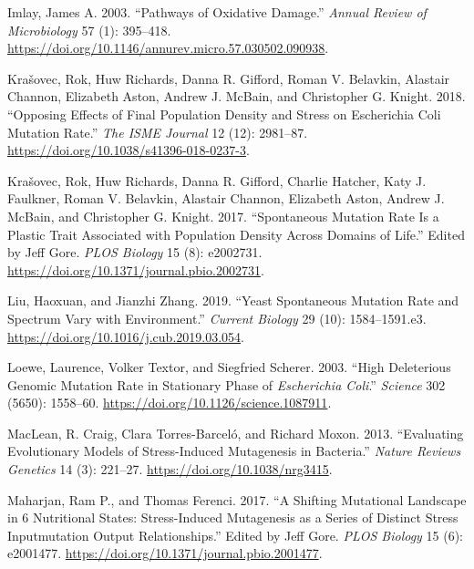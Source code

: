 \documentclass[
  12pt,
  letterpaper,
  DIV=11,
  numbers=noendperiod]{scrreprt}
\newlength{\cslhangindent}
\newlength{\cslentryspacingunit} %
\newenvironment{CSLReferences}[2] %
 {%
  \setlength{\parindent}{0pt}
  \ifodd #1
  \let\oldpar\par
  \def\par{\hangindent=\cslhangindent\oldpar}
  \fi
  \setlength{\parskip}{#2\cslentryspacingunit}
 }%
 {}
\begin{document}
\begin{CSLReferences}{1}{0}
\leavevmode{}%
Imlay, James A. 2003. {``Pathways of Oxidative Damage.''} \emph{Annual
Review of Microbiology} 57 (1): 395--418.
\url{https://doi.org/10.1146/annurev.micro.57.030502.090938}.

\leavevmode{}%
Krašovec, Rok, Huw Richards, Danna R. Gifford, Roman V. Belavkin,
Alastair Channon, Elizabeth Aston, Andrew J. McBain, and Christopher G.
Knight. 2018. {``Opposing Effects of Final Population Density and Stress
on Escherichia Coli Mutation Rate.''} \emph{The ISME Journal} 12 (12):
2981--87. \url{https://doi.org/10.1038/s41396-018-0237-3}.

\leavevmode{}%
Krašovec, Rok, Huw Richards, Danna R. Gifford, Charlie Hatcher, Katy J.
Faulkner, Roman V. Belavkin, Alastair Channon, Elizabeth Aston, Andrew
J. McBain, and Christopher G. Knight. 2017. {``Spontaneous Mutation Rate
Is a Plastic Trait Associated with Population Density Across Domains of
Life.''} Edited by Jeff Gore. \emph{PLOS Biology} 15 (8): e2002731.
\url{https://doi.org/10.1371/journal.pbio.2002731}.

\leavevmode{}%
Liu, Haoxuan, and Jianzhi Zhang. 2019. {``Yeast Spontaneous Mutation
Rate and Spectrum Vary with Environment.''} \emph{Current Biology} 29
(10): 1584--1591.e3. \url{https://doi.org/10.1016/j.cub.2019.03.054}.

\leavevmode{}%
Loewe, Laurence, Volker Textor, and Siegfried Scherer. 2003. {``High
Deleterious Genomic Mutation Rate in Stationary Phase of
{\emph{Escherichia Coli}}.''} \emph{Science} 302 (5650): 1558--60.
\url{https://doi.org/10.1126/science.1087911}.

\leavevmode{}%
MacLean, R. Craig, Clara Torres-Barceló, and Richard Moxon. 2013.
{``Evaluating Evolutionary Models of Stress-Induced Mutagenesis in
Bacteria.''} \emph{Nature Reviews Genetics} 14 (3): 221--27.
\url{https://doi.org/10.1038/nrg3415}.

\leavevmode{}%
Maharjan, Ram P., and Thomas Ferenci. 2017. {``A Shifting Mutational
Landscape in 6 Nutritional States: Stress-Induced Mutagenesis as a
Series of Distinct Stress Input{\textendash}mutation Output
Relationships.''} Edited by Jeff Gore. \emph{PLOS Biology} 15 (6):
e2001477. \url{https://doi.org/10.1371/journal.pbio.2001477}.


\end{CSLReferences}
\end{document}
